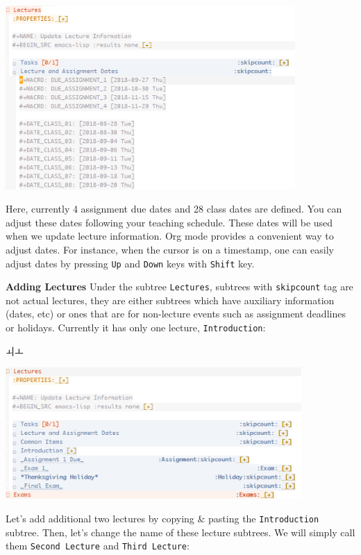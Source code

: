 \documentclass[10pt,article]{article}
\begin{document}
\begin{center}
\includegraphics[height=7cm]{../../../Assets/Images/Org-Teaching/Quickstart_Lectures-Dates.png}
\end{center}

Here, currently 4 assignment due dates and 28 class dates are defined. You can
adjust these dates following your teaching schedule. These dates will be used
when we update lecture information. Org mode provides a convenient way to
adjust dates. For instance, when the cursor is on a timestamp, one can easily
adjust dates by pressing \texttt{Up} and \texttt{Down} keys with \texttt{Shift} key.

\textbf{Adding Lectures} Under the subtree \texttt{Lectures}, subtrees with \texttt{skipcount} tag
are not actual lectures, they are either subtrees which have auxiliary
information (dates, etc) or ones that are for non-lecture events such as
assignment deadlines or holidays. Currently it has only one lecture,
\texttt{Introduction}:

ㅚㅗ\begin{center}
\includegraphics[height=5cm]{../../../Assets/Images/Org-Teaching/Quickstart_Lectures-Lectures.png}
\end{center}

Let's add additional two lectures by copying \& pasting the \texttt{Introduction}
subtree. Then, let's change the name of these lecture subtrees. We will simply
call them \texttt{Second Lecture} and \texttt{Third Lecture}:
\end{document}
